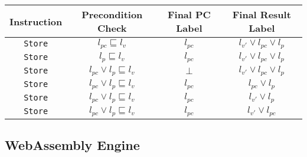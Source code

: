 \documentclass[sigconf,review,anonymous]{acmart}
\begin{document}
\begin{center}
\scriptsize
\begin{tabular}{|c|c|c|c|}
\hline
\textbf{Instruction} & \textbf{Precondition Check} & \textbf{Final PC Label} & \textbf{Final Result Label} \\
\hline
\texttt{Store} & $l_{pc} \sqsubseteq l_{v}$ & $l_{pc}$ & $l_{v'} \vee l_{pc} \vee l_{p}$ \\
\texttt{Store} & $l_{p} \sqsubseteq l_{v}$ & $l_{pc}$ & $l_{v'} \vee l_{pc} \vee l_{p}$ \\
\hline
\texttt{Store} & $l_{pc} \vee l_{p} \sqsubseteq l_{v}$ & $\bot$ & $l_{v'} \vee l_{pc} \vee l_{p}$ \\
\hline
\texttt{Store} & $l_{pc} \vee l_{p} \sqsubseteq l_{v}$ & $l_{pc}$ & $l_{pc} \vee l_{p}$ \\
\texttt{Store} & $l_{pc} \vee l_{p} \sqsubseteq l_{v}$ & $l_{pc}$ & $l_{v'} \vee l_{p}$ \\
\texttt{Store} & $l_{pc} \vee l_{p} \sqsubseteq l_{v}$ & $l_{pc}$ & $l_{v'} \vee l_{pc}$ \\
\hline
\end{tabular}
\end{center}


\subsection{WebAssembly Engine}
\end{document}
